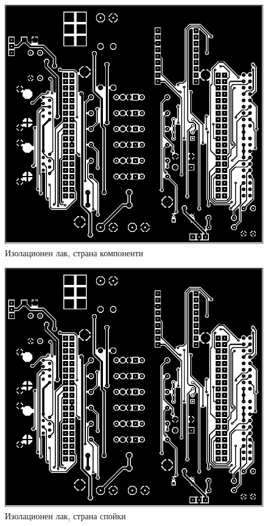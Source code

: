 \begin{figure}[!htbp]
    \centering
    \includegraphics[page=5]{documents/main_board.pdf}
    \caption{Изолационен лак, страна компоненти}
    \label{fig:main_top_res}
\end{figure}
\begin{figure}[!htbp]
    \centering
    \includegraphics[page=6]{documents/main_board.pdf}
    \caption{Изолационен лак, страна спойки}
    \label{fig:main_bot_res}
\end{figure}
